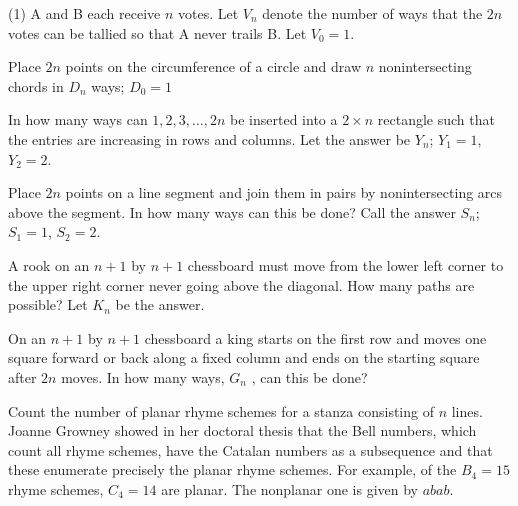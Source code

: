 \documentclass[10pt,]{book}
\theoremstyle{plain}
\theoremstyle{definition}
\theoremstyle{definition}
\theoremstyle{definition}
\theoremstyle{definition}
\numberwithin{equation}{chapter}
\begin{document}
\begin{exercisegroup}(1)
\exercise[13.] \hypertarget{exercise-63}{}
\hypertarget{p-931}{}%
A and B each receive \(n\) votes. Let \(V_{n}\) denote the number of ways that the \(2n\) votes can be tallied so that A never trails B. Let \(V_{0} = 1\).%

\exercise[14.] \hypertarget{exercise-64}{}
\hypertarget{p-932}{}%
Place \(2n\) points on the circumference of a circle and draw \(n\)  nonintersecting chords in \(D_{n}\) ways; \(D_{0} = 1\)%

\exercise[15.] \hypertarget{exercise-65}{}
\hypertarget{p-933}{}%
In how many ways can \(1, 2, 3, \ldots, 2n\) be inserted into a \(2\times n\) rectangle such that the entries are increasing in rows and columns.  Let the answer be \(Y_n\); \(Y_1 = 1\), \(Y_2 = 2\).%

\exercise[16.] \hypertarget{exercise-66}{}
\hypertarget{p-934}{}%
Place \(2n\) points on a line segment and join them in pairs by nonintersecting arcs above the segment. In how many ways can this be done? Call the answer \(S_{n}\); \(S_{1}=1\), \(S_{2}=2\).%

\exercise[17.] \hypertarget{exercise-67}{}
\hypertarget{p-935}{}%
A rook on an \(n + 1\) by \(n + 1\) chessboard must move from the lower left corner to the upper right corner never going above the diagonal. How many paths are possible? Let \(K_{n}\) be the answer.%

\exercise[18.] \hypertarget{exercise-68}{}
\hypertarget{p-936}{}%
On an \(n + 1\) by \(n + 1\) chessboard a king starts on the first row and moves one square forward or back along a fixed column and ends on the starting square after \(2n\) moves. In how many ways, \(G_{n}\) , can this be done?%

\exercise[19.] \hypertarget{exercise-69}{}
\hypertarget{p-937}{}%
Count the number of planar rhyme schemes for a stanza consisting of \(n\) lines. Joanne Growney showed in her doctoral thesis that the Bell numbers, which count all rhyme schemes, have the Catalan numbers as a subsequence and that these enumerate precisely the planar rhyme schemes. For example, of the \(B_4 = 15\) rhyme schemes, \(C_4 = 14\) are planar. The nonplanar one is given by \(abab\).%

\end{exercisegroup}\par\medskip\noindent
\typeout{************************************************}
\typeout{************************************************}
\end{document}
